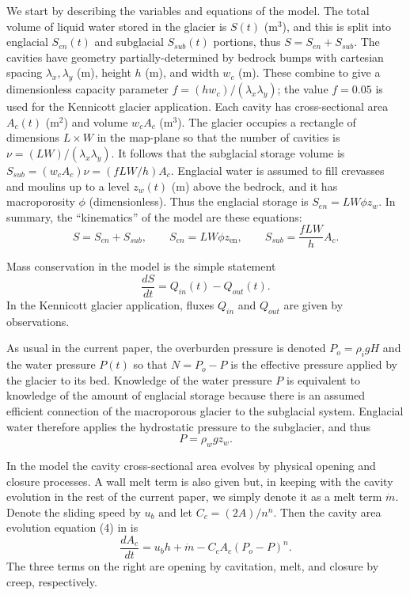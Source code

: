 \documentclass[11pt,final]{amsart}
\newcommand{\zen}{z_{\text{en}}}
\begin{document}
We start by describing the variables and equations of the \cite{Bartholomausetal2011} model.  The total volume of liquid water stored in the glacier is $S(t)$ (m$^3$), and this is split into englacial $S_{en}(t)$ and subglacial $S_{sub}(t)$ portions, thus $S=S_{en}+S_{sub}$.  The cavities have geometry partially-determined by bedrock bumps with cartesian spacing $\lambda_x,\lambda_y$ (m), height $h$ (m), and width $w_c$ (m).  These combine to give a dimensionless capacity parameter $f=(h w_c)/(\lambda_x \lambda_y)$; the value $f=0.05$ is used for the Kennicott glacier application.  Each cavity has cross-sectional area $A_c(t)$ (m$^2$) and volume $w_c A_c$ (m$^3$).  The glacier occupies a rectangle of dimensions $L\times W$ in the map-plane so that the number of cavities is $\nu = (LW)/(\lambda_x\lambda_y)$.  It follows that the subglacial storage volume is $S_{sub} = (w_c A_c) \nu = (f L W/h) A_c$.  Englacial water is assumed to fill crevasses and moulins up to a level $z_w(t)$ (m) above the bedrock, and it has macroporosity $\phi$ (dimensionless).  Thus the englacial storage is $S_{en}=L W \phi z_w$.  In summary, the ``kinematics'' of the \cite{Bartholomausetal2011} model are these equations:
\begin{equation}
S = S_{en} + S_{sub}, \qquad S_{en} = L W \phi \zen, \qquad S_{sub} = \frac{f L W}{h} A_c.  \label{eq:barth:kinematics}
\end{equation}

Mass conservation in the model is the simple statement  \citep{Bartholomausetal2008}
\begin{equation}
\frac{dS}{dt} = Q_{in}(t) - Q_{out}(t). \label{eq:barth:massconserve}
\end{equation}
In the Kennicott glacier application, fluxes $Q_{in}$ and $Q_{out}$ are given by observations.

As usual in the current paper, the overburden pressure is denoted $P_o=\rho_i g H$ and the water pressure $P(t)$ so that $N=P_o-P$ is the effective pressure applied by the glacier to its bed.  Knowledge of the water pressure $P$ is equivalent to knowledge of the amount of englacial storage because there is an assumed efficient connection of the macroporous glacier to the subglacial system.  Englacial water therefore applies the hydrostatic pressure to the subglacier, and thus
\begin{equation}
P = \rho_w g z_w.  \label{eq:barth:englacialpressure}
\end{equation}

In the \cite{Bartholomausetal2011} model the cavity cross-sectional area evolves by physical opening and closure processes.  A wall melt term is also given but, in keeping with the cavity evolution in the rest of the current paper, we simply denote it as a melt term $\dot m$.  Denote the sliding speed by $u_b$ and let $C_c = (2 A)/n^n$.  Then the cavity area evolution equation (4) in \cite{Bartholomausetal2011} is
\begin{equation}
\frac{dA_c}{dt} = u_b h + \dot m - C_c A_c (P_o-P)^n.  \label{eq:barth:cavityevolution}
\end{equation}
The three terms on the right are opening by cavitation, melt, and closure by creep, respectively.
\end{document}
